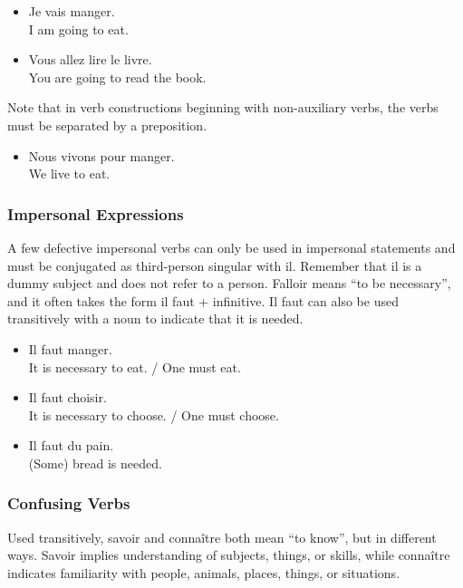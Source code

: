 \begin{itemize}
  \item  Je vais manger. \\ I am going to eat.
  \item  Vous allez lire le livre. \\ You are going to read the book.
\end{itemize}

Note that in verb constructions beginning with non-auxiliary verbs, the verbs must be separated by a preposition.

\begin{itemize}
  \item  Nous vivons pour manger. \\ We live to eat.
\end{itemize}

\subsubsection{Impersonal Expressions}

A few defective impersonal verbs can only be used in impersonal statements and must be conjugated as third-person singular with il. Remember that il is a dummy subject and does not refer to a person.  Falloir means ``to be necessary'', and it often takes the form il faut + infinitive.  Il faut can also be used transitively with a noun to indicate that it is needed.

\begin{itemize}
  \item  Il faut manger. \\ It is necessary to eat. / One must eat.
  \item  Il faut choisir. \\ It is necessary to choose. / One must choose.
  \item  Il faut du pain. \\ (Some) bread is needed.
\end{itemize}

\subsubsection{Confusing Verbs}

Used transitively, savoir and connaître both mean ``to know'', but in different ways. Savoir implies understanding of subjects, things, or skills, while connaître indicates familiarity with people, animals, places, things, or situations.


